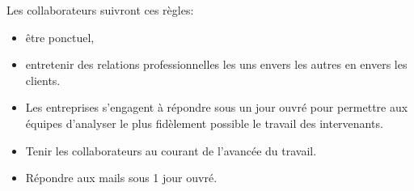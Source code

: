 Les collaborateurs suivront ces règles:
\begin{itemize}
\item être ponctuel,
\item entretenir des relations professionnelles les uns envers les
        autres en envers les clients.
\item Les entreprises s'engagent à répondre sous un jour ouvré pour 
        permettre aux équipes d'analyser le plus fidèlement possible
        le travail des intervenants.
\item Tenir les collaborateurs au courant de l'avancée du travail.
\item Répondre aux mails sous 1 jour ouvré.
\end{itemize}
